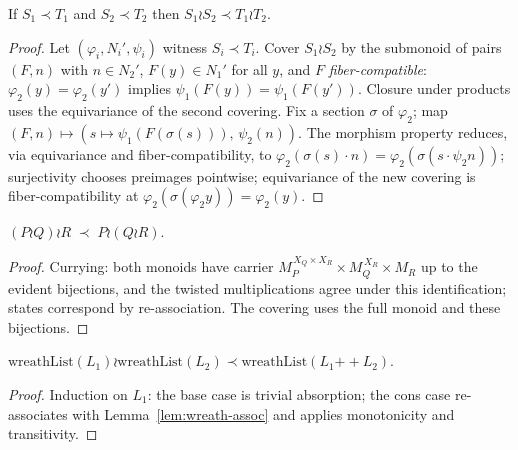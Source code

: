 \begin{lemma}[Monotonicity]\label{lem:wreath-mono}
  \leanok
  If $S_1 \prec T_1$ and $S_2 \prec T_2$ then
  $S_1 \wr S_2 \prec T_1 \wr T_2$.
\end{lemma}
\begin{proof}
  \leanok
  Let $(\varphi_i, N_i', \psi_i)$ witness $S_i \prec T_i$. Cover
  $S_1 \wr S_2$ by the submonoid of pairs $(F, n)$ with
  $n \in N_2'$, $F(y) \in N_1'$ for all $y$, and $F$
  \emph{fiber-compatible}: $\varphi_2(y) = \varphi_2(y')$ implies
  $\psi_1(F(y)) = \psi_1(F(y'))$. Closure under products uses the
  equivariance of the second covering. Fix a section
  $\sigma$ of $\varphi_2$; map $(F, n) \mapsto
  (s \mapsto \psi_1(F(\sigma(s))),\, \psi_2(n))$. The morphism
  property reduces, via equivariance and fiber-compatibility, to
  $\varphi_2(\sigma(s) \cdot n) = \varphi_2(\sigma(s \cdot \psi_2 n))$;
  surjectivity chooses preimages pointwise; equivariance of the new
  covering is fiber-compatibility at $\varphi_2(\sigma(\varphi_2 y)) =
  \varphi_2(y)$.
\end{proof}

\begin{lemma}\label{lem:wreath-assoc}
  \leanok{}
  $(P \wr Q) \wr R \;\prec\; P \wr (Q \wr R)$.
\end{lemma}
\begin{proof}
  \leanok
  Currying: both monoids have carrier
  $M_P^{\,X_Q \times X_R} \times M_Q^{\,X_R} \times M_R$ up to the
  evident bijections, and the twisted multiplications agree under this
  identification; states correspond by re-association. The covering
  uses the full monoid and these bijections.
\end{proof}

\begin{lemma}[Append]\label{lem:wreathList-append}
  \leanok
  $\mathrm{wreathList}(L_1) \wr \mathrm{wreathList}(L_2) \prec
   \mathrm{wreathList}(L_1 \mathbin{+\!\!+} L_2)$.
\end{lemma}
\begin{proof}
  \leanok
  Induction on $L_1$: the base case is trivial absorption; the cons
  case re-associates with Lemma~\ref{lem:wreath-assoc} and applies
  monotonicity and transitivity.
\end{proof}

